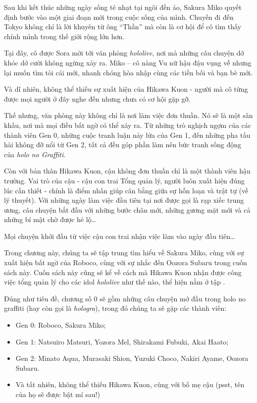 \documentclass[main.tex]{subfiles}
\begin{document}
Sau khi kết thúc những ngày sống tẻ nhạt tại ngôi đền ảo, Sakura Miko quyết định bước vào một giai đoạn mới trong cuộc sống của mình. Chuyến đi đến Tokyo không chỉ là lời khuyên từ ông ``Thần'' mà còn là cơ hội để cô tìm thấy chính mình trong thế giới rộng lớn hơn.

Tại đây, cô được Sora mời tới văn phòng \textit{hololive}, nơi mà những câu chuyện dở khóc dở cười không ngừng xảy ra. Miko -- cô nàng Vu nữ hậu đậu vụng về nhưng lại muốn tìm tòi cái mới, nhanh chóng hòa nhập cùng các tiền bối và bạn bè mới.

Và dĩ nhiên, không thể thiếu sự xuất hiện của Hikawa Kuon - người mà cô từng được mọi người ở đây nghe đến nhưng chưa có cơ hội gặp gỡ.

Thế nhưng, văn phòng này không chỉ là nơi làm việc đơn thuần. Nó sẽ là một sân khấu, nơi mà mọi điều bất ngờ có thể xảy ra. Từ những trò nghịch ngợm của các thành viên Gen 0, những cuộc tranh luận nảy lửa của Gen 1, đến những pha tấu hài không đỡ nổi từ Gen 2, tất cả đều góp phần làm nên bức tranh sống động của \textit{holo no Graffiti}.

Còn với bản thân Hikawa Kuon, cậu không đơn thuần chỉ là một thành viên hậu trường. Vai trò của cậu - cậu con trai Tổng quản lý, người luôn xuất hiện đúng lúc cần thiết - chính là điểm nhấn giúp cân bằng giữa sự hỗn loạn và trật tự (về lý thuyết). Với những ngày làm việc đầu tiên tại nơi được gọi là rạp xiếc trung ương, câu chuyện bắt đầu với những bước chân mới, những gương mặt mới và cả những bí mật chờ được hé lộ\ldots

Mọi chuyện khởi đầu từ việc cậu con trai nhận việc làm vào ngày đầu tiên\ldots

Trong chương này, chúng ta sẽ tập trung tìm hiểu về Sakura Miko, cùng với sự xuất hiện bất ngờ của Roboco, cùng với sự nhắc đến Oozora Subaru trong cuốn sách này. Cuốn sách này cũng sẽ kể về cách mà Hikawa Kuon nhận được công việc tổng quản lý cho các idol \textit{hololive} như thế nào, thể hiện nằm ở tập {}.

Đúng như tiêu đề, chương số 0 sẽ gồm những câu chuyện mở đầu trong holo no graffiti (hay còn gọi là \textit{hologra}), trong đó chúng ta sẽ gặp các thành viên:
\begin{itemize}
    \item Gen 0: Roboco, Sakura Miko;
    \item Gen 1: Natsuiro Matsuri, Yozora Mel, Shirakami Fubuki, Akai Haato;
    \item Gen 2: Minato Aqua, Murasaki Shion, Yuzuki Choco, Nakiri Ayame, Oozora Subaru.
    \item Và tất nhiên, không thể thiếu Hikawa Kuon, cùng với bố mẹ cậu (psst, tên của họ sẽ được bật mí sau!)
\end{itemize}
\end{document}

